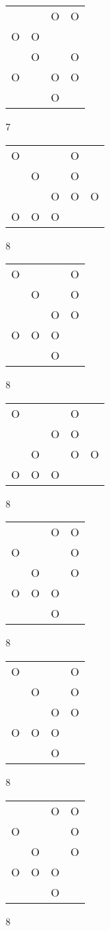 \begin{tabular}{|m{0.2cm}m{0.2cm}m{0.2cm}m{0.2cm}|}\hline
 & &O&O\\
O&O& & \\
 &O& &O\\
O& &O&O\\
 & &O& \\
\hline\end{tabular}7
\begin{tabular}{|m{0.2cm}m{0.2cm}m{0.2cm}m{0.2cm}m{0.2cm}|}\hline
O& & &O& \\
 &O& &O& \\
 & &O&O&O\\
O&O&O& & \\
\hline\end{tabular}8
\begin{tabular}{|m{0.2cm}m{0.2cm}m{0.2cm}m{0.2cm}|}\hline
O& & &O\\
 &O& &O\\
 & &O&O\\
O&O&O& \\
 & &O& \\
\hline\end{tabular}8
\begin{tabular}{|m{0.2cm}m{0.2cm}m{0.2cm}m{0.2cm}m{0.2cm}|}\hline
O& & &O& \\
 & &O&O& \\
 &O& &O&O\\
O&O&O& & \\
\hline\end{tabular}8
\begin{tabular}{|m{0.2cm}m{0.2cm}m{0.2cm}m{0.2cm}|}\hline
 & &O&O\\
O& & &O\\
 &O& &O\\
O&O&O& \\
 & &O& \\
\hline\end{tabular}8
\begin{tabular}{|m{0.2cm}m{0.2cm}m{0.2cm}m{0.2cm}|}\hline
O& & &O\\
 &O& &O\\
 & &O&O\\
O&O&O& \\
 & &O& \\
\hline\end{tabular}8
\begin{tabular}{|m{0.2cm}m{0.2cm}m{0.2cm}m{0.2cm}|}\hline
 & &O&O\\
O& & &O\\
 &O& &O\\
O&O&O& \\
 & &O& \\
\hline\end{tabular}8
